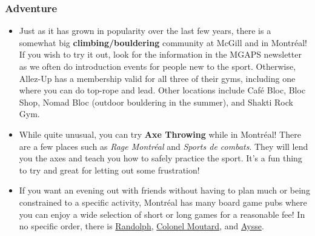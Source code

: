 \subsubsection{Adventure}
\begin{itemize}
    \item Just as it has grown in popularity over the last few years, there is a somewhat big \textbf{climbing/bouldering} community at McGill and in Montréal! If you wish to try it out, look for the information in the MGAPS newsletter as we often do introduction events for people new to the sport. Otherwise, Allez-Up has a membership valid for all three of their gyms, including one where you can do top-rope and lead. Other locations include Café Bloc, Bloc Shop, Nomad Bloc (outdoor bouldering in the summer), and Shakti Rock Gym. 
    \item While quite unusual, you can try \textbf{Axe Throwing} while in Montréal! There are a few places such as \textit{Rage Montréal} and \textit{Sports de combats}. They will lend you the axes and teach you how to safely practice the sport. It's a fun thing to try and great for letting out some frustration!
    \item If you want an evening out with friends without having to plan much or being constrained to a specific activity, Montréal has many board game pubs where you can enjoy a wide selection of short or long games for a reasonable fee! In no specific order, there is \href{https://maps.app.goo.gl/KFguqV2jX4RTyHjC7}{Randolph}, \href{https://maps.app.goo.gl/Tg3gvhN78JZaeNzb6}{Colonel Moutard}, and \href{https://maps.app.goo.gl/tSmz2U3ZADBaTKhc8}{Aysse}.
\end{itemize}


